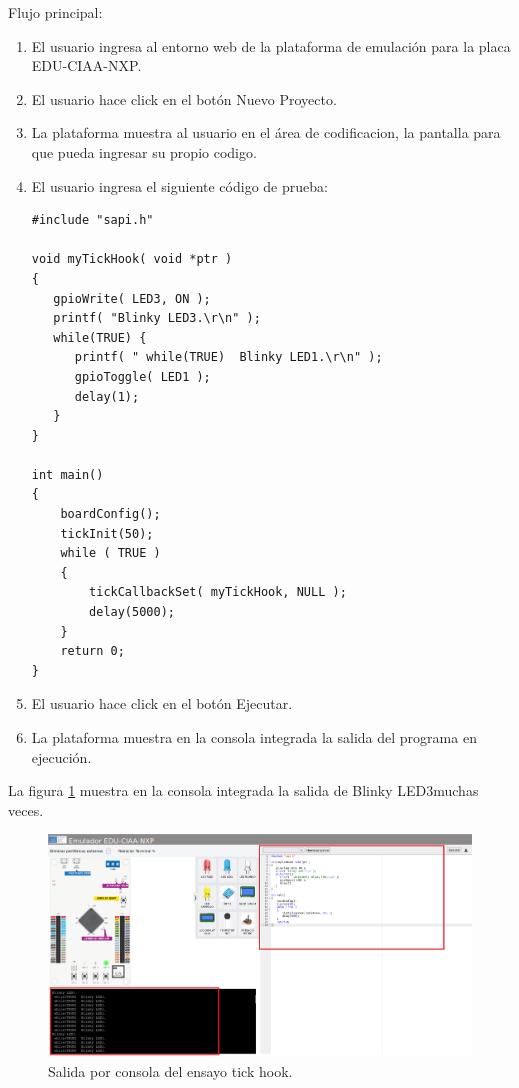 Flujo principal:
\begin{enumerate}
	\item El usuario ingresa al entorno web de la plataforma de emulación para la placa EDU-CIAA-NXP.
	\item El usuario hace click en el botón \textquotedbl Nuevo Proyecto\textquotedbl.
	\item La plataforma muestra al usuario en el área de codificacion, la pantalla para que pueda ingresar su propio codigo.
	\item El usuario ingresa el siguiente código de prueba:
	
\begin{lstlisting}[caption={nuevo proyecto}]
#include "sapi.h"

void myTickHook( void *ptr )
{
   gpioWrite( LED3, ON );
   printf( "Blinky LED3.\r\n" );
   while(TRUE) {
      printf( " while(TRUE)  Blinky LED1.\r\n" );
      gpioToggle( LED1 );
      delay(1);
   }
}

int main()
{
    boardConfig();
    tickInit(50);
    while ( TRUE )
    {
		tickCallbackSet( myTickHook, NULL );
		delay(5000);
    }
    return 0;
}
\end{lstlisting}

	\item El usuario hace click en el botón \textquotedbl Ejecutar\textquotedbl.
	\item La plataforma muestra en la consola integrada la salida del programa en ejecución.
	
\end{enumerate}
	

La figura \ref{fig:Testtickhook} muestra en la consola integrada la salida de \textquotedbl Blinky LED3\textquotedbl muchas veces. 

\hfill \break
\hfill \break
\hfill \break
\hfill \break
\hfill \break
\hfill \break
\hfill \break
\hfill \break
\hfill \break
\hfill \break
\hfill \break

\begin{figure}[ht]
	\centering
	\includegraphics[scale=.20]{./Figures/Testtickhook.png}
	\caption{Salida por consola del ensayo tick hook.}
	\label{fig:Testtickhook}
\end{figure}

